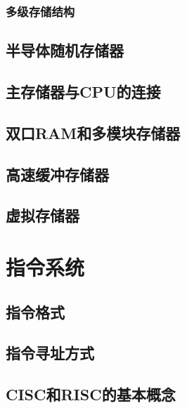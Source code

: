 \documentclass{ctexart}
\begin{document}
\subsubsection{多级存储结构}



\subsection{半导体随机存储器}



\subsection{主存储器与CPU的连接}



\subsection{双口RAM和多模块存储器}

\subsection{高速缓冲存储器}

\subsection{虚拟存储器}





\section{指令系统}

\subsection{指令格式}

\subsection{指令寻址方式}

\subsection{CISC和RISC的基本概念}
\end{document}
